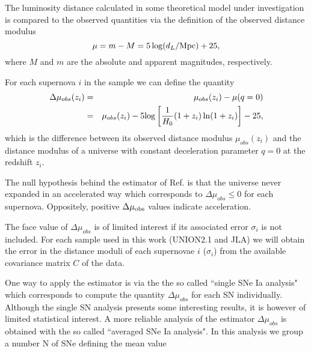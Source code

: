 \documentclass[nofootinbib,twocolumn]{revtex4}
\begin{document}
The luminosity distance calculated in some theoretical model under investigation is compared to the observed quantities via the definition of the observed distance modulus
\begin{equation}
\mu = m-M= 5 \log (d_L / {\rm Mpc}) + 25,
\end{equation}
where $M$ and $m$ are the absolute and apparent magnitudes, respectively.

For each supernova $i$ in the sample we can define the quantity
\begin{eqnarray}
\Delta \mu_{obs} (z_i) &=& \mu_{obs}(z_i) - \mu(q=0) \\ \nonumber
&=& \mu_{obs} (z_i)-5{\rm log}\left[\frac{1}{H_0}(1+z_i)\ln (1+z_i)\right]-25,
\label{eqDeltaobs}
\end{eqnarray}
which is the difference between its observed distance modulus $\mu_{obs}(z_i)$ and the distance modulus of a universe with constant deceleration parameter $q=0$ at the redshift $z_i$.


The null hypothesis behind the estimator of Ref. \cite{Seikel:2007pk} is that the universe never expanded in an accelerated way which corresponds to $\Delta \mu_{obs} {\leq} 0$ for each supernova. Oppositely, positive $\Delta \mu_{\rm obs}$ values indicate acceleration. 

The face value of $\Delta \mu_{obs}$ is of limited interest if its associated error $\sigma_i$ is not included. For each sample used in this work (UNION2.1 and JLA) we will obtain the error in the distance moduli of each supernovae $i$ ($\sigma_i$) from the available covariance matrix $C$ of the data. %

One way to apply the estimator is via the the so called ``single SNe Ia analysis" which corresponds to compute the quantity $\Delta \mu_{obs}$ for each SN individually. Although the single SN analysis presents some interesting results, it is however of limited statistical interest. A more reliable analysis of the estimator $\Delta \mu_{obs}$ is obtained with the so called ``averaged SNe Ia analysis". In this analysis we group a number N of SNe defining the mean value
\end{document}
